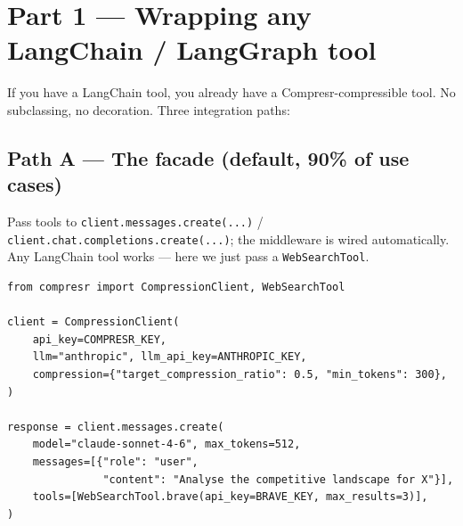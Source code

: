 \documentclass[10pt,a4paper]{article}
\begin{document}
\begin{center}
\end{center}

\section{Part 1 --- Wrapping any LangChain / LangGraph tool}

If you have a LangChain tool, you already have a Compresr-compressible tool. No subclassing, no decoration. Three integration paths:

\subsection{Path A --- The facade (default, 90\% of use cases)}

Pass tools to \texttt{client.messages.create(...)} / \texttt{client.chat.completions.create(...)}; the middleware is wired automatically. Any LangChain tool works --- here we just pass a \texttt{WebSearchTool}.

\begin{lstlisting}
from compresr import CompressionClient, WebSearchTool

client = CompressionClient(
    api_key=COMPRESR_KEY,
    llm="anthropic", llm_api_key=ANTHROPIC_KEY,
    compression={"target_compression_ratio": 0.5, "min_tokens": 300},
)

response = client.messages.create(
    model="claude-sonnet-4-6", max_tokens=512,
    messages=[{"role": "user",
               "content": "Analyse the competitive landscape for X"}],
    tools=[WebSearchTool.brave(api_key=BRAVE_KEY, max_results=3)],
)
\end{lstlisting}
\end{document}

